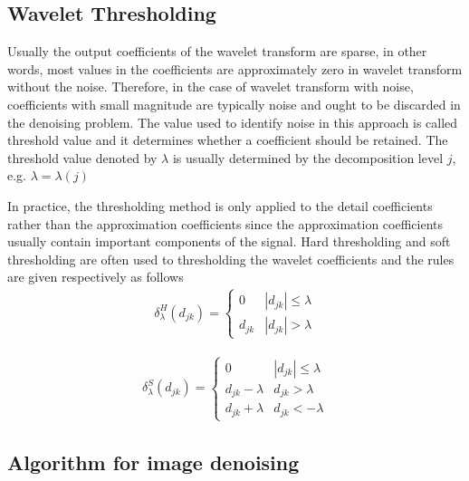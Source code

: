 \subsection{Wavelet Thresholding}
Usually the output coefficients of the wavelet transform are sparse, in other words, most values in the coefficients are approximately zero in wavelet transform without the noise. Therefore, in the case of wavelet transform with noise, coefficients with small magnitude are typically noise and ought to be discarded in the denoising problem. The value used to identify noise in this approach is called threshold value and it determines whether a coefficient should be retained. The threshold value denoted by $\lambda$ is usually determined by the decomposition level $j$, e.g. $\lambda= \lambda(j)$

In practice, the thresholding method is only applied to the detail coefficients rather than the approximation coefficients since the approximation coefficients usually contain important components of the signal. Hard thresholding and soft thresholding are often used to thresholding the wavelet coefficients and the rules are given respectively as follows
\begin{eqnarray}
\delta^H_\lambda(d_{jk}) =
\begin{cases}
0       & |d_{jk}|\leqslant \lambda \\
d_{jk}   & |d_{jk}| > \lambda 
\end{cases}
\end{eqnarray}

\begin{eqnarray}
\delta^S_\lambda(d_{jk}) =
\begin{cases}
0       & |d_{jk}|\leqslant \lambda \\
d_{jk}-\lambda   & d_{jk} > \lambda \\
d_{jk}+\lambda   & d_{jk} < -\lambda 
\end{cases}
\end{eqnarray}


\subsection{Algorithm for image denoising}

\renewcommand{\algorithmicrequire}{ \textbf{Input:}} %
\renewcommand{\algorithmicensure}{ \textbf{Output:}} %

